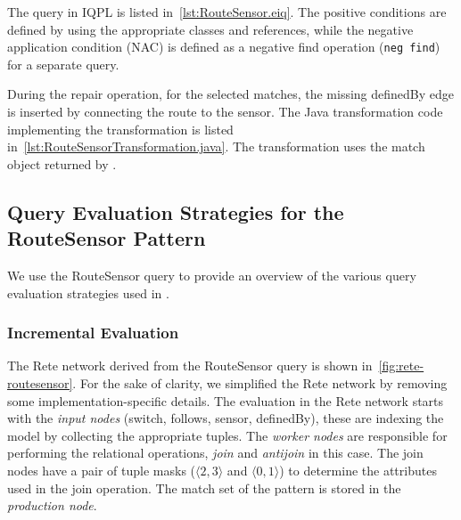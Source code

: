\documentclass[submission,copyright,creativecommons]{eptcs}
\begin{document}
The query in IQPL is listed in~\autoref{lst:RouteSensor.eiq}. The positive conditions are defined by using the appropriate classes and references, while the negative application condition (NAC) is defined as a negative find operation (\texttt{neg find}) for a separate query.


During the \textsf{repair} operation, for the selected matches, the missing \textsf{definedBy} edge is inserted by connecting the
route to the sensor. The Java transformation code implementing the transformation is listed in~\autoref{lst:RouteSensorTransformation.java}. The transformation uses the match object returned by \eiq.



\subsection{Query Evaluation Strategies for the \textsf{RouteSensor} Pattern}

We use the \textsf{RouteSensor} query to provide an overview of the various query evaluation strategies used in \eiq.

\subsubsection{Incremental Evaluation}

The Rete network derived from the \textsf{RouteSensor} query is shown in~\autoref{fig:rete-routesensor}. For the sake of clarity, we simplified the Rete network by removing some implementation-specific details. The evaluation in the Rete network starts with the \emph{input nodes} (\textsf{switch}, \textsf{follows}, \textsf{sensor}, \textsf{definedBy}), these are indexing the model by collecting the appropriate tuples. The \emph{worker nodes} are responsible for performing the relational operations, \emph{join} and \emph{antijoin} in this case. The join nodes have a pair of tuple masks (\eg $\langle 2, 3 \rangle$ and $\langle 0, 1 \rangle$) to determine the attributes used in the join operation. The match set of the pattern is stored in the \emph{production node}.

\end{document}
